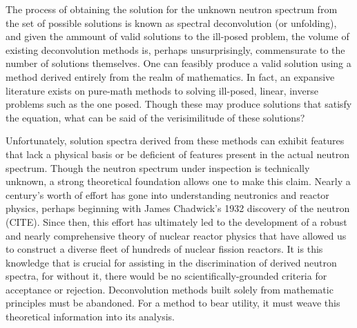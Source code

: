 The process of obtaining the solution for the unknown neutron spectrum from the set of possible solutions is known as spectral deconvolution (or unfolding), and given the ammount of valid solutions to the ill-posed problem, the volume of existing deconvolution methods is, perhaps unsurprisingly, commensurate to the number of solutions themselves.
One can feasibly produce a valid solution using a method derived entirely from the realm of mathematics.
In fact, an expansive literature exists on pure-math methods to solving ill-posed, linear, inverse problems such as the one posed.
Though these may produce solutions that satisfy the equation, what can be said of the verisimilitude of these solutions?

Unfortunately, solution spectra derived from these methods can exhibit features that lack a physical basis or be deficient of features present in the actual neutron spectrum.
Though the neutron spectrum under inspection is technically unknown, a strong theoretical foundation allows one to make this claim.
Nearly a century's worth of effort has gone into understanding neutronics and reactor physics, perhaps beginning with James Chadwick's 1932 discovery of the neutron (CITE).
Since then, this effort has ultimately led to the development of a robust and nearly comprehensive theory of nuclear reactor physics that have allowed us to construct a diverse fleet of hundreds of nuclear fission reactors.
It is this knowledge that is crucial for assisting in the discrimination of derived neutron spectra, for without it, there would be no scientifically-grounded criteria for acceptance or rejection.
Deconvolution methods built solely from mathematic principles must be abandoned.
For a method to bear utility, it must weave this theoretical information into its analysis.

